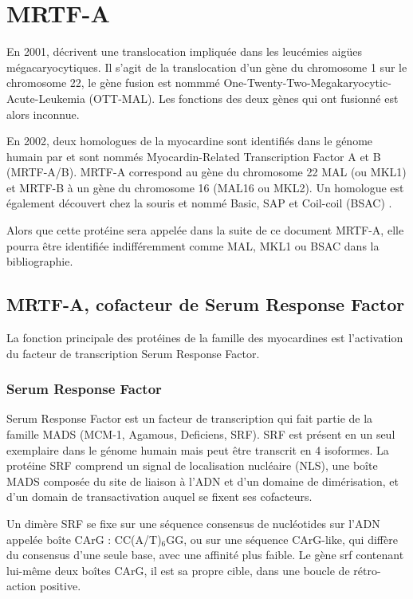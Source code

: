 \documentclass{report}
\begin{document}
\chapter*{MRTF-A}
En 2001, \cite{mercher_involvement_2001} 
décrivent une translocation impliquée dans les leucémies aigües mégacaryocytiques. 
Il s'agit de la translocation d'un gène du chromosome 1 sur le chromosome 22, le gène fusion est nommmé One-Twenty-Two-Megakaryocytic-Acute-Leukemia (OTT-MAL). 
Les fonctions des deux gènes qui ont fusionné est alors inconnue. 

En 2002, deux homologues de la myocardine sont identifiés dans le génome humain par \cite{wang_potentiation_2002} et sont nommés Myocardin-Related Transcription Factor A et B (MRTF-A/B).
MRTF-A correspond au gène du chromosome 22 MAL (ou MKL1) et MRTF-B à un gène du chromosome 16 (MAL16 ou MKL2). 
Un homologue est également découvert chez la souris et nommé Basic, SAP et Coil-coil (BSAC) \parencite{sasazuki_identification_2002}. 

Alors que cette protéine sera appelée dans la suite de ce document MRTF-A, elle pourra être identifiée indifféremment comme MAL, MKL1 ou BSAC dans la bibliographie. 

\section{MRTF-A, cofacteur de Serum Response Factor}

La fonction principale des protéines de la famille des myocardines est l'activation du facteur de transcription Serum Response Factor. 

\subsection{Serum Response Factor}

Serum Response Factor est un facteur de transcription qui fait partie de la famille MADS (MCM-1, Agamous, Deficiens, SRF). SRF est présent en un seul exemplaire dans le génome humain mais peut être transcrit en 4 isoformes. 
La protéine SRF comprend un signal de localisation nucléaire (NLS), une boîte MADS composée du site de liaison à l'ADN et d'un domaine de dimérisation, et d'un domain de transactivation auquel se fixent ses cofacteurs. 

Un dimère SRF se fixe sur une séquence consensus de nucléotides sur l'ADN appelée boîte CArG : CC(A/T)$_{6}$GG, ou sur une séquence CArG-like, qui diffère du consensus d'une seule base, avec une affinité plus faible. Le gène srf contenant lui-même deux boîtes CArG, il est sa propre cible, dans une boucle de rétro-action positive. 
\end{document}
